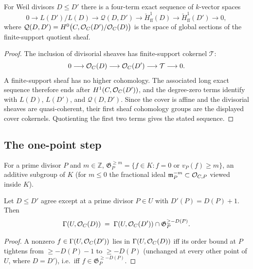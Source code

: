 \begin{proposition}
  \label{thm:adelic_twist_exact_sequence}
  For Weil divisors \(D \le D'\) there is a four-term exact sequence of
  \(k\)-vector spaces
  \[
    0 \longrightarrow L(D')/L(D)
      \longrightarrow \mathcal{Q}(D, D')
      \longrightarrow \check{H}^1_{\mathrm{ff}}(D)
      \longrightarrow \check{H}^1_{\mathrm{ff}}(D')
      \longrightarrow 0,
  \]
  where \(\mathcal{Q}(D, D') = H^0\bigl(C, \mathcal{O}_{C}(D')/\mathcal{O}_{C}(D)\bigr)\)
  is the space of global sections of the finite-support quotient sheaf.
\end{proposition}
\begin{proof}
  The inclusion of divisorial sheaves has finite-support cokernel
  \(\mathcal T\):
  \[
    0\longrightarrow\mathcal{O}_{C}(D)\longrightarrow\mathcal{O}_{C}(D')
      \longrightarrow\mathcal T\longrightarrow0.
  \]
  A finite-support sheaf has no higher cohomology.  The associated long
  exact sequence therefore ends after \(H^1(C,\mathcal{O}_{C}(D'))\), and the
  degree-zero terms identify with \(L(D)\), \(L(D')\), and
  \(\mathcal Q(D,D')\).  Since the cover is affine and the divisorial
  sheaves are quasi-coherent, their first sheaf cohomology groups are the
  displayed cover cokernels.  Quotienting the first two terms gives the
  stated sequence.
\end{proof}

\subsection{The one-point step}

\begin{definition}
  \label{def:adelic_orderGe}
  \leanok
  For a prime divisor \(P\) and \(m \in \mathbb{Z}\),
  \(\mathfrak G_P^{\ge m} = \{ f \in K : f = 0 \text{ or } v_P(f) \ge m
  \}\), an additive subgroup of \(K\) (for \(m \le 0\) the fractional
  ideal \(\mathfrak m_P^{-m} \subset \mathcal{O}_{C,P}\) viewed inside \(K\)).
\end{definition}

\begin{theorem}
  \label{thm:adelic_local_step_identity}
  \leanok
  Let \(D \le D'\) agree except at a prime divisor \(P \in U\) with
  \(D'(P) = D(P) + 1\). Then
  \[
    \Gamma(U, \mathcal{O}_{C}(D)) \;=\; \Gamma(U, \mathcal{O}_{C}(D')) \cap
      \mathfrak G_P^{\ge -D(P)}.
  \]
\end{theorem}
\begin{proof}
  \leanok
  A nonzero \(f \in \Gamma(U, \mathcal{O}_{C}(D'))\) lies in \(\Gamma(U,
  \mathcal{O}_{C}(D))\) iff its order bound at \(P\) tightens from \(\ge
  -D(P)-1\) to \(\ge -D(P)\) (unchanged at every other point of \(U\),
  where \(D = D'\)), i.e.\ iff \(f \in \mathfrak G_P^{\ge -D(P)}\).
\end{proof}

